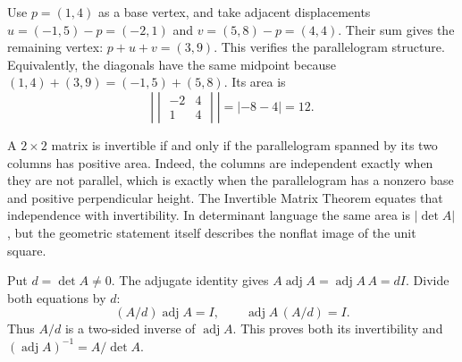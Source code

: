 Use $p=(1,4)$ as a base vertex, and take adjacent displacements $u=(-1,5)-p=(-2,1)$ and $v=(5,8)-p=(4,4)$. Their sum gives the remaining vertex: $p+u+v=(3,9)$. This verifies the parallelogram structure. Equivalently, the diagonals have the same midpoint because $(1,4)+(3,9)=(-1,5)+(5,8)$. Its area is
\[
\left|\begin{vmatrix}-2&4\\1&4\end{vmatrix}\right|
=|-8-4|=12.
\]

A $2\times2$ matrix is invertible if and only if the parallelogram spanned by its two columns has positive area. Indeed, the columns are independent exactly when they are not parallel, which is exactly when the parallelogram has a nonzero base and positive perpendicular height. The Invertible Matrix Theorem equates that independence with invertibility. In determinant language the same area is $|\det A|$, but the geometric statement itself describes the nonflat image of the unit square.

Put $d=\det A\ne0$. The adjugate identity gives $A\operatorname{adj}A=\operatorname{adj}A\,A=dI$. Divide both equations by $d$:
\[
(A/d)\operatorname{adj}A=I,
\qquad \operatorname{adj}A\,(A/d)=I.
\]
Thus $A/d$ is a two-sided inverse of $\operatorname{adj}A$. This proves both its invertibility and $(\operatorname{adj}A)^{-1}=A/\det A$.

